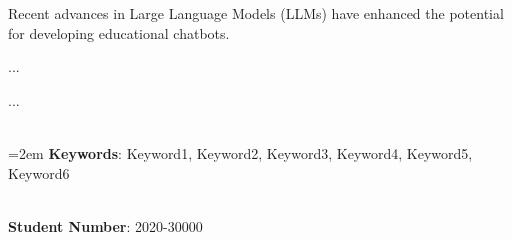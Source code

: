 \documentclass[12pt]{report}
\begin{document}
\quad Recent advances in Large Language Models (LLMs) have enhanced the potential for developing educational chatbots. 

\quad ...

\quad ...

~\\
\hangindent=2em
\textbf{Keywords}: Keyword1, Keyword2, Keyword3, Keyword4, Keyword5, Keyword6

~\\
\noindent \textbf{Student Number}: 2020-30000



%
\end{document}
